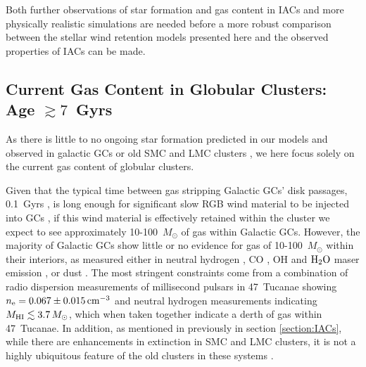 \documentclass[fleqn,usenatbib]{mnras}
\begin{document}
 Both further observations of star formation and gas content in IACs and more physically realistic simulations are needed before a more robust comparison between the stellar wind retention models presented here and the observed properties of IACs can be made.


\subsection{Current Gas Content in Globular Clusters: Age $\gtrsim 7$~Gyrs}


 As there is little to no ongoing star formation predicted in our models and observed in galactic GCs or old SMC and LMC clusters \citep[e.g.][]{mart2018}, we here focus solely on the current gas content of globular clusters.

 Given that the typical time between gas stripping Galactic GCs' disk passages, 0.1~Gyrs \citep{odenkirchen1997}, is long enough for significant slow RGB wind material to be injected into GCs \citep{tayler1975}, if this wind material is effectively retained within the cluster we expect to see approximately 10-100~$M_\odot$ of gas within Galactic GCs.
 However, the majority of Galactic GCs show little or no evidence for gas of 10-100~$M_\odot$ within their interiors, as measured either in neutral hydrogen \citep{heiles1966, robinson1967, kerr1972, knapp1973b, bowers1979, birkinshaw1983, lynch1989, smith1990, vanloon2006, vanloon2009}, CO \citep{troland1978,smith1995, leon1996}, OH and $\rm{H_2 O}$ maser emission \citep{knapp1973a, kerr1976, frail1994, cohen1979, dickey1980, vanloon2006}, or dust \citep{lynch1990, knapp1995, origlia1996, hopwood1998,hopwood1999,evans2003, boyer2006,barmby2009}.  
 The most stringent constraints come from a combination of radio dispersion measurements of millisecond pulsars in 47~Tucanae \citep{camilo2000} showing $n_{\rm e} = 0.067 \pm 0.015 \, {\rm cm^{-3}}$ and neutral hydrogen measurements indicating $M_{\rm HI} \lesssim 3.7 \, M_\odot$, which when taken together indicate a derth of gas within 47~Tucanae.
 In addition, as mentioned in previously in section \ref{section:IACs}, while there are enhancements in extinction in SMC and LMC clusters, it is not a highly ubiquitous feature of the old clusters in these systems \citep{perren2017}.
\end{document}
